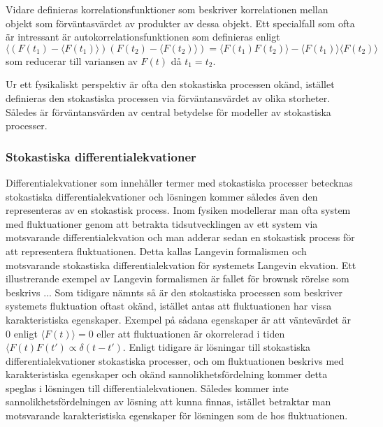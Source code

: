 Vidare definieras korrelationsfunktioner som beskriver korrelationen mellan objekt som förväntasvärdet av produkter av dessa objekt. Ett specialfall som ofta är intressant är autokorrelationsfunktionen som definieras enligt
\begin{equation}
\langle (F(t_1)-\langle F(t_1)\rangle)(F(t_2)-\langle F(t_2)\rangle) = \langle F(t_1)F(t_2)\rangle - \langle F(t_1)\rangle\langle F(t_2)\rangle
\end{equation}
som reducerar till variansen av $F(t)$ då $t_1=t_2$.

Ur ett fysikaliskt perspektiv är ofta den stokastiska processen okänd, istället definieras den stokastiska processen via förväntansvärdet av olika storheter. Således är förväntansvärden av central betydelse för modeller av stokastiska processer. 


\subsubsection{Stokastiska differentialekvationer}
Differentialekvationer som innehåller termer med stokastiska processer betecknas stokastiska differentialekvationer och lösningen kommer således även den representeras av en stokastisk process. Inom fysiken modellerar man ofta system med fluktuationer genom att betrakta tidsutvecklingen av ett system via motsvarande differentialekvation och man adderar sedan en stokastisk process för att representera fluktuationen. Detta kallas Langevin formalismen och motsvarande stokastiska differentialekvation för systemets Langevin ekvation. Ett illustrerande exempel av Langevin formalismen är fallet för brownsk rörelse som beskrivs ... Som tidigare nämnts så är den stokastiska processen som beskriver systemets fluktuation oftast okänd, istället antas att fluktuationen har vissa karakteristiska egenskaper. Exempel på sådana egenskaper är att väntevärdet är $0$ enligt $\langle F(t)\rangle = 0$ eller att fluktuationen är okorrelerad i tiden $\langle F(t)F(t')\propto\delta(t-t')$. Enligt tidigare är lösningar till stokastiska differentialekvationer stokastiska processer, och om fluktuationen beskrivs med karakteristiska egenskaper och okänd sannolikhetsfördelning kommer detta speglas i lösningen till differentialekvationen. Således kommer inte sannolikhetsfördelningen av lösning att kunna finnas, istället betraktar man motsvarande karakteristiska egenskaper för lösningen som de hos fluktuationen. 

